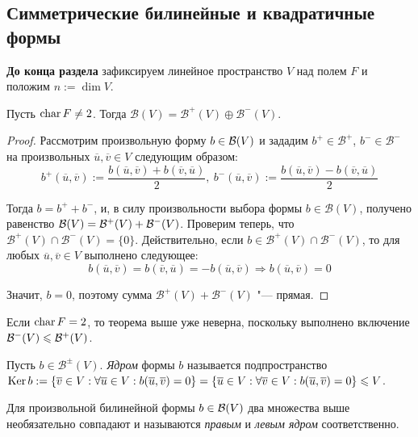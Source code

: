 \subsection{Симметрические билинейные и квадратичные формы}

\textbf{До конца раздела} зафиксируем линейное пространство $V$ над полем $F$ и положим $n := \dim{V}$.

\begin{theorem}
	Пусть $\operatorname{char}{F} \ne 2$. Тогда $\mathcal{B}(V) = \mathcal{B}^+(V) \oplus \mathcal{B}^-(V)$.
\end{theorem}

\begin{proof}
	Рассмотрим произвольную форму $b \in \mathcal B(V)$ и зададим $b^+ \in \mathcal{B}^+$, $b^- \in \mathcal{B}^-$ на произвольных $\overline u, \overline v \in V$ следующим образом:
	\[b^+(\overline{u}, \overline{v}) := \frac{b(\overline{u}, \overline{v}) + b(\overline{v}, \overline{u})}{2},~b^-(\overline{u}, \overline{v}) := \frac{b(\overline{u}, \overline{v}) - b(\overline{v}, \overline{u})}{2}\]
	
	Тогда $b = b^+ + b^-$, и, в силу произвольности выбора формы $b \in \mathcal{B}(V)$, получено равенство $\mathcal{B}(V) \hm{=} \mathcal{B}^+(V) + \mathcal{B}^-(V)$. Проверим теперь, что $\mathcal{B}^+(V) \cap \mathcal{B}^-(V) = \{0\}$. Действительно, если $b \in \mathcal{B}^+(V) \cap \mathcal{B}^-(V)$, то для любых $\overline u, \overline v \in V$ выполнено следующее:
	\[b(\overline{u}, \overline{v}) = b(\overline{v}, \overline{u}) = -b(\overline{u}, \overline{v}) \Rightarrow b(\overline{u}, \overline{v}) = 0\]
	
	Значит, $b = 0$, поэтому сумма $\mathcal{B}^+(V) + \mathcal{B}^-(V)$ "--- прямая.
\end{proof}

\begin{note}
	Если $\operatorname{char}{F} = 2$, то теорема выше уже неверна, поскольку выполнено включение $\mathcal B^-(V) \leqslant \mathcal B^+(V)$.
\end{note}

\begin{definition}
	Пусть $b \in \mathcal{B}^\pm(V)$. \textit{Ядром} формы $b$ называется подпространство $\operatorname{Ker}{b} := \{\overline{v} \in V: \forall \overline{u} \in V: b(\overline{u}, \overline{v}) = 0\} = \{\overline{u} \in V: \forall \overline{v} \in V: b(\overline{u}, \overline{v}) = 0\} \leqslant V$.
\end{definition}

\begin{note}
	Для произвольной билинейной формы $b \in \mathcal B(V)$ два множества выше необязательно совпадают и называются \textit{правым} и \textit{левым ядром} соответственно.
\end{note}

